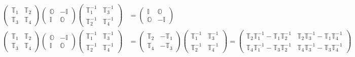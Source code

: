 \documentclass[aps,preprint]{revtex4}
\begin{document}
\begin{align}
\left( 
\begin{array}{cc}
\mathbb{T}_{1} & \mathbb{T}_{2} \\ 
\mathbb{T}_{3} & \mathbb{T}_{4}%
\end{array}%
\right) \left( 
\begin{array}{cc}
\mathbb{O} & -\mathbb{I} \\ 
\mathbb{I} & \mathbb{O}%
\end{array}%
\right) \left( 
\begin{array}{cc}
\mathbb{T}_{1}^{-1} & \mathbb{T}_{3}^{-1} \\ 
\mathbb{T}_{2}^{-1} & \mathbb{T}_{4}^{-1}%
\end{array}%
\right) & =\left( 
\begin{array}{cc}
\mathbb{I} & \mathbb{O} \\ 
\mathbb{O} & -\mathbb{I}%
\end{array}%
\right) \\
\left( 
\begin{array}{cc}
\mathbb{T}_{1} & \mathbb{T}_{2} \\ 
\mathbb{T}_{3} & \mathbb{T}_{4}%
\end{array}%
\right) \left( 
\begin{array}{cc}
\mathbb{O} & -\mathbb{I} \\ 
\mathbb{I} & \mathbb{O}%
\end{array}%
\right) \left( 
\begin{array}{cc}
\mathbb{T}_{1}^{-1} & \mathbb{T}_{3}^{-1} \\ 
\mathbb{T}_{2}^{-1} & \mathbb{T}_{4}^{-1}%
\end{array}%
\right) & =\left( 
\begin{array}{cc}
\mathbb{T}_{2} & -\mathbb{T}_{1} \\ 
\mathbb{T}_{4} & -\mathbb{T}_{3}%
\end{array}%
\right) \left( 
\begin{array}{cc}
\mathbb{T}_{1}^{-1} & \mathbb{T}_{3}^{-1} \\ 
\mathbb{T}_{2}^{-1} & \mathbb{T}_{4}^{-1}%
\end{array}%
\right) =\left( 
\begin{array}{cc}
\mathbb{T}_{2}\mathbb{T}_{1}^{-1}-\mathbb{T}_{1}\mathbb{T}_{2}^{-1} & 
\mathbb{T}_{2}\mathbb{T}_{3}^{-1}-\mathbb{T}_{1}\mathbb{T}_{4}^{-1} \\ 
\mathbb{T}_{4}\mathbb{T}_{1}^{-1}-\mathbb{T}_{3}\mathbb{T}_{2}^{-1} & 
\mathbb{T}_{4}\mathbb{T}_{3}^{-1}-\mathbb{T}_{3}\mathbb{T}_{4}^{-1}%
\end{array}%
\right)
\end{align}%
\end{document}
